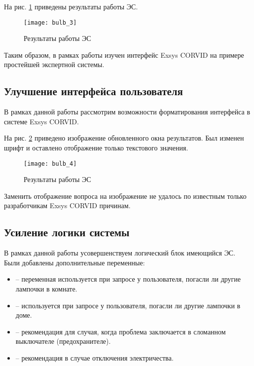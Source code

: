 На рис. \ref{fig:bulb_3} приведены результаты работы ЭС.

\begin{figure}[H]
	\centering
	\texttt{[image: bulb\_3]}
	\caption{Результаты работы ЭС}
	\label{fig:bulb_3}
\end{figure}

Таким образом, в рамках работы изучен интерфейс Exsys CORVID на примере простейшей экспертной системы.

\subsection{Улучшение интерфейса пользователя}

В рамках данной работы рассмотрим возможности форматирования интерфейса в системе Exsys CORVID.

На рис. \ref{fig:bulb_4} приведено изображение обновленного окна результатов. Был изменен шрифт и оставлено отображение только текстового значения.

\begin{figure}[H]
	\centering
	\texttt{[image: bulb\_4]}
	\caption{Результаты работы ЭС}
	\label{fig:bulb_4}
\end{figure}

Заменить отображение вопроса на изображение не удалось по известным только разработчикам Exsys CORVID причинам.

\subsection{Усиление логики системы}

В рамках данной работы усовершенствуем логический блок имеющийся ЭС. Были добавлены дополнительные переменные:
\begin{itemize}
	\item {} -- переменная используется при запросе
	у пользователя, погасли ли другие лампочки в комнате.
	\item {} -- используется при запросе у
	пользователя, погасли ли другие лампочки в доме.
	\item {} -- рекомендация для случая, когда проблема
	заключается в сломанном выключателе (предохранителе).
	\item {} -- рекомендация в случае отключения
	электричества.
\end{itemize}

